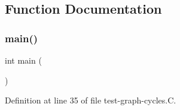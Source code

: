 \subsection{Function Documentation}
\mbox{\label{test-graph-cycles_8_c_ae66f6b31b5ad750f1fe042a706a4e3d4}} 
\subsubsection{\texorpdfstring{main()}{main()}}
{\footnotesize\ttfamily int main (\begin{DoxyParamCaption}{ }\end{DoxyParamCaption})}



Definition at line 35 of file test-\/graph-\/cycles.\+C.

